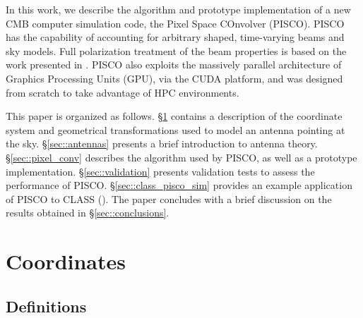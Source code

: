 \documentclass[a4paper,11pt]{article}
\begin{document}



In this work, we describe the algorithm and prototype implementation of a new CMB computer simulation code, the Pixel Space COnvolver (PISCO). PISCO has the capability of accounting for arbitrary shaped, time-varying beams and sky models. Full polarization treatment of the beam properties is based on the work presented in \cite{2007MNRAS.376.1767O}. PISCO also exploits the massively parallel architecture of Graphics Processing Units (GPU), via the CUDA platform, and was designed from scratch to take advantage of HPC environments.

This paper is organized as follows. 
\S\ref{sec::coordinate-systems} contains a description of the coordinate system and geometrical transformations used to model an antenna pointing at the sky.
\S\ref{sec::antennas} presents a brief introduction to antenna theory. 
\S\ref{sec::pixel_conv} describes the algorithm used by PISCO, as well as a prototype implementation. 
\S\ref{sec::validation} presents validation tests to assess the performance of PISCO. 
\S\ref{sec::class_pisco_sim} provides an example application of PISCO to CLASS (\cite{2016SPIE.9914E..1KH}). 
The paper concludes with a brief discussion on the results obtained in \S\ref{sec::conclusions}.

%
\section{Coordinates}
\label{sec::coordinate-systems}

\subsection{Definitions}
\end{document}
